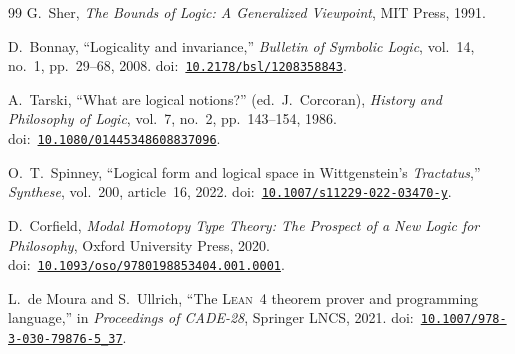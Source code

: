 \documentclass[jsl,bibother]{asl}
\theoremstyle{definition}
\theoremstyle{remark}
\begin{document}
\begin{thebibliography}{99}
G.~Sher,
\emph{The Bounds of Logic: A Generalized Viewpoint},
MIT Press, 1991.

D.~Bonnay,
``Logicality and invariance,''
\emph{Bulletin of Symbolic Logic}, vol.~14, no.~1, pp.~29--68,
2008.
\newline doi:~\href{https://doi.org/10.2178/bsl/1208358843}{\texttt{10.2178/bsl/1208358843}}.

A.~Tarski,
``What are logical notions?''
(ed.\ J.~Corcoran),
\emph{History and Philosophy of Logic}, vol.~7, no.~2,
pp.~143--154, 1986.
\newline doi:~\href{https://doi.org/10.1080/01445348608837096}{\texttt{10.1080/01445348608837096}}.

O.~T.~Spinney,
``Logical form and logical space in Wittgenstein's
\emph{Tractatus},''
\emph{Synthese}, vol.~200, article~16, 2022.
\newline doi:~\href{https://doi.org/10.1007/s11229-022-03470-y}{\texttt{10.1007/s11229-022-03470-y}}.

D.~Corfield,
\emph{Modal Homotopy Type Theory: The Prospect of a New Logic
for Philosophy},
Oxford University Press, 2020.
\newline doi:~\href{https://doi.org/10.1093/oso/9780198853404.001.0001}{\texttt{10.1093/oso/9780198853404.001.0001}}.

L.~de Moura and S.~Ullrich,
``The \textsc{Lean}~4 theorem prover and programming language,''
in \emph{Proceedings of CADE-28}, Springer LNCS, 2021.
\newline doi:~\href{https://doi.org/10.1007/978-3-030-79876-5_37}{\texttt{10.1007/978-3-030-79876-5\_37}}.

\end{thebibliography}
\end{document}
